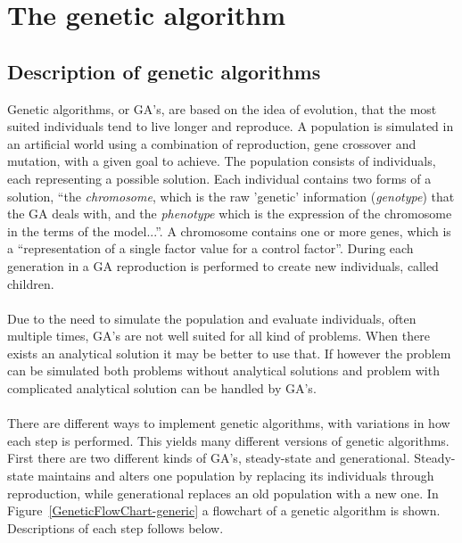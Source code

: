 \section{The genetic algorithm}
\subsection{Description of genetic algorithms}
Genetic algorithms, or GA's, are based on the idea of evolution, that the most suited individuals tend to live longer and reproduce. A population is simulated in an artificial world using a combination of reproduction, gene crossover and mutation, with a given goal to achieve. The population consists of individuals, each representing a possible  solution. Each individual contains two forms of a solution, ``the \textit{chromosome}, which is the raw 'genetic' information (\textit{genotype}) that the GA deals with, and the \textit{phenotype} which is the expression of the chromosome in the terms of the model...''\cite{GAHandbook1}. %
A chromosome contains one or more genes, which is a ``representation of a single factor value for a control factor''\cite{GAHandbook1}. %
During each generation in a GA reproduction is performed to create new individuals, called children.\\\\
Due to the need to simulate the population and evaluate individuals, often multiple times, GA's are not well suited for all kind of problems. When there exists an analytical solution it may be better to use that. %
If however the problem can be simulated both problems without analytical solutions and problem with complicated analytical solution can be handled by GA's.\\\\
There are different ways to implement genetic algorithms, with variations in how each step is performed. This yields many different versions of genetic algorithms. First there are two different kinds of GA's, steady-state and generational. Steady-state maintains and alters one population by replacing its individuals through reproduction, while generational replaces an old population with a new one. In Figure~\ref{GeneticFlowChart-generic} a flowchart of a genetic algorithm is shown. Descriptions of each step follows below.\\\\
